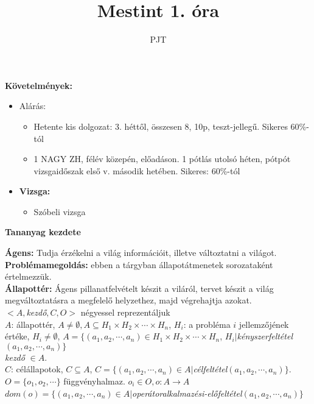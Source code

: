\documentclass[a4paper, 12pt, fullpage]{article}
\author{PJT}
\title{Mestint 1. óra}
\begin{document}
    \maketitle
    \textbf{Követelmények:}
    \begin{itemize}
        \item {Alárás: 
            \begin{itemize}
                \item Hetente kis dolgozat: 3. héttől, összesen 8, 10p, teszt-jellegű. Sikeres 60\%-tól
                \item 1 NAGY ZH, félév közepén, előadáson. 1 pótlás utolsó héten, pótpót vizsgaidőszak első v. második hetében. Sikeres: 60\%-tól
            \end{itemize}
        }
        \item {\textbf{Vizsga:}
            \begin{itemize}
                \item Szóbeli vizsga
            \end{itemize}
        }
    \end{itemize}
    \newpage
    \begin{center}
        \Large\textbf{Tananyag kezdete}
    \end{center}
    \noindent\textbf{Ágens:} Tudja érzékelni a világ információit, illetve változtatni a világot.\\
    \textbf{Problémamegoldás:} ebben a tárgyban állapotátmenetek sorozataként értelmezzük.\\
    \textbf{Állapottér:} Ágens pillanatfelvételt készit a viláról, tervet készit a világ megváltoztatásra a megfelelő helyzethez, majd végrehajtja azokat.\\
    $<A, $\textit{kezdő}$, C, O>$ négyessel reprezentáljuk\\
    $A$: állapottér, $A \neq \emptyset, A \subseteq H_1 \times H_2 \times \cdots \times H_n$, $H_i$: a probléma $i$ jellemzőjének értéke, $H_i \neq \emptyset$, $A = \{(a_1, a_2, \cdots, a_n) \in H_1 \times H_2 \times \cdots \times H_n$, $H_i | $\textit{kényszerfeltétel}$(a_1, a_2, \cdots, a_n)\}$\\
    \textit{kezdő} $\in A$.\\
    $C$: célállapotok, $C \subseteq A$, $C = \{(a_1, a_2, \cdots, a_n) \in A | $\textit{célfeltétel}$(a_1, a_2, \cdots, a_n)\}$.\\
    $O = \{o_1, o_2, \cdots\}$ függvényhalmaz. $o_i \in O, o: A \rightarrow A$\\
    $dom(o) = \{(a_1, a_2, \cdots, a_n) \in A | $\textit{operátoralkalmazési-előfeltétel}$(a_1, a_2, \cdots, a_n)\}$\\
\end{document}
